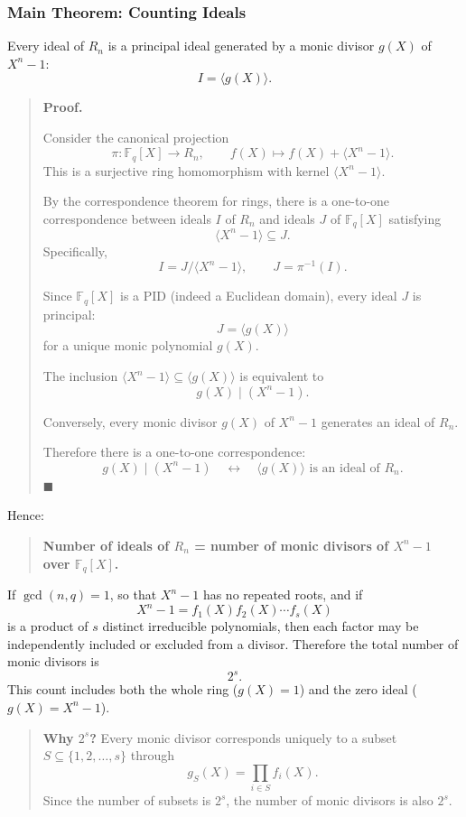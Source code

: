 \documentclass[
]{article}
\begin{document}
\subsubsection{Main Theorem: Counting
Ideals}\label{main-theorem-counting-ideals}

Every ideal of \(R_n\) is a principal ideal generated by a monic divisor
\(g(X)\) of \(X^n-1\): \[I = \langle g(X) \rangle.\]

\begin{quote}
\textbf{Proof.}

Consider the canonical projection
\[\pi: \mathbb{F}_q[X] \to R_n, \qquad f(X) \mapsto f(X)+\langle X^n-1 \rangle.\]
This is a surjective ring homomorphism with kernel
\(\langle X^n-1 \rangle\).

By the correspondence theorem for rings, there is a one-to-one
correspondence between ideals \(I\) of \(R_n\) and ideals \(J\) of
\(\mathbb{F}_q[X]\) satisfying \[\langle X^n-1 \rangle \subseteq J.\]
Specifically, \[I = J / \langle X^n-1 \rangle, \qquad J = \pi^{-1}(I).\]

Since \(\mathbb{F}_q[X]\) is a PID (indeed a Euclidean domain), every
ideal \(J\) is principal: \[J=\langle g(X) \rangle\] for a unique monic
polynomial \(g(X)\).

The inclusion \(\langle X^n-1 \rangle \subseteq \langle g(X) \rangle\)
is equivalent to \[g(X) \mid (X^n-1).\]

Conversely, every monic divisor \(g(X)\) of \(X^n-1\) generates an ideal
of \(R_n\).

Therefore there is a one-to-one correspondence:
\[g(X) \mid (X^n-1) \quad \longleftrightarrow \quad \langle g(X) \rangle \text{ is an ideal of } R_n.\]
\(\blacksquare\)
\end{quote}

Hence:

\begin{quote}
\textbf{Number of ideals of \(R_n\) = number of monic divisors of
\(X^n-1\) over \(\mathbb{F}_q[X]\).}
\end{quote}

If \(\gcd(n,q)=1\), so that \(X^n-1\) has no repeated roots, and if
\[X^n-1=f_1(X)f_2(X)\cdots f_s(X)\] is a product of \(s\) distinct
irreducible polynomials, then each factor may be independently included
or excluded from a divisor. Therefore the total number of monic divisors
is \[2^s.\] This count includes both the whole ring (\(g(X)=1\)) and the
zero ideal (\(g(X)=X^n-1\)).

\begin{quote}
\textbf{Why \(2^s\)?} Every monic divisor corresponds uniquely to a
subset \(S \subseteq \{1,2,\dots,s\}\) through
\[g_S(X)=\prod_{i\in S} f_i(X).\] Since the number of subsets is
\(2^s\), the number of monic divisors is also \(2^s\).
\end{quote}
\end{document}

